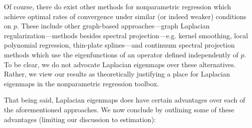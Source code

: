 Of course, there do exist other methods for nonparametric regression which achieve optimal rates of convergence under similar (or indeed weaker) conditions on $p$. These include other graph-based approaches---graph Laplacian regularization---methods besides spectral projection---e.g. kernel smoothing, local polynomial regression, thin-plate splines---and continuum spectral projection methods which use the eigenfunctions of an operator defined independently of $p$. To be clear, we do not advocate Laplacian eigenmaps over these alternatives. Rather, we view our results as theoretically justifying a place for Laplacian eigenmaps in the nonparametric regression toolbox. 

That being said, Laplacian eigenmaps does have certain advantages over each of the aforementioned approaches. We now conclude by outlining some of these advantages (limiting our discussion to estimation):

